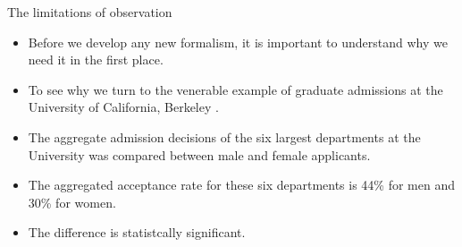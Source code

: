 \documentclass[handout]{beamer}
\begin{document}
\begin{frame}{The limitations of observation}
\scriptsize{
\begin{itemize}
\item Before we develop any new formalism, it is important to understand why we need it in the first place.
\item To see why we turn to the venerable example of graduate admissions at the University of California, Berkeley  \cite{bickel1975sex}.

\item The aggregate admission decisions of the six largest departments at the University was compared between male and female applicants. 
\item The aggregated acceptance rate for these six departments is 44\% for men and 30\% for women.

\item The difference is statistcally significant. 



\end{itemize}

} 

\end{frame}
\end{document}
